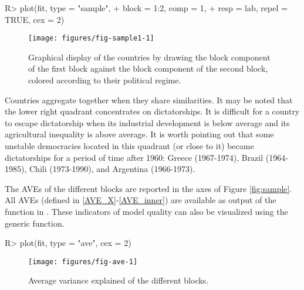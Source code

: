 \documentclass[
]{jss}
\begin{document}
\begin{CodeChunk}
\begin{CodeInput}
R> plot(fit, type = "sample",
+      block = 1:2, comp = 1,
+      resp = lab, repel = TRUE, cex = 2)
\end{CodeInput}
\begin{figure}[H]

{\centering \texttt{[image: figures/fig-sample1-1]} 

}

\caption{\label{fig:sample}Graphical display of the countries by drawing the block component of the first block against the block component of the second block, colored according to their political regime.}\label{fig:fig-sample1}
\end{figure}
\end{CodeChunk}

\normalsize

Countries aggregate together when they share similarities. It may be
noted that the lower right quadrant concentrates on dictatorships. It is
difficult for a country to escape dictatorship when its industrial
development is below average and its agricultural inequality is above
average. It is worth pointing out that some unstable democracies located
in this quadrant (or close to it) became dictatorships for a period of
time after 1960: Greece (1967-1974), Brazil (1964-1985), Chili
(1973-1990), and Argentina (1966-1973).

The AVEs of the different blocks are reported in the axes of Figure
\ref{fig:sample}. All AVEs (defined in \eqref{AVE_X}-\eqref{AVE_inner})
are available as output of the  function in
. These indicators of model quality can also be
visualized using the generic  function.

\footnotesize

\begin{CodeChunk}
\begin{CodeInput}
R> plot(fit, type = "ave", cex = 2)
\end{CodeInput}
\begin{figure}[H]

{\centering \texttt{[image: figures/fig-ave-1]} 

}

\caption[Average variance explained of the different blocks]{Average variance explained of the different blocks.}\label{fig:fig-ave}
\end{figure}
\end{CodeChunk}
\end{document}
